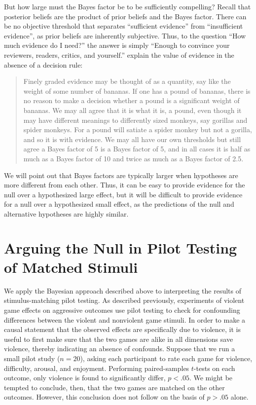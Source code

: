 \documentclass[man]{apa6}
\begin{document}
But how large must the Bayes factor be to be sufficiently compelling? Recall that posterior beliefs are the product of prior beliefs and the Bayes factor. There can be no objective threshold that separates ``sufficient evidence'' from ``insufficient evidence'', as prior beliefs are inherently subjective. Thus, to the question ``How much evidence do I need?'' the answer is simply ``Enough to convince your reviewers, readers, critics, and yourself.'' \citet[p. 12]{Rouder:etal:submitted} explain the value of evidence in the absence of a decision rule: 
\begin{quote}
Finely graded evidence may be thought of as a quantity, say like the weight of some number of bananas. If one has a pound of bananas, there is no reason to make a decision whether a pound is a significant weight of bananas. We may all agree that it is what it is, a pound, even though it may have different meanings to differently sized monkeys, say gorillas and spider monkeys. For a pound will satiate a spider monkey but not a gorilla, and so it is with evidence. We may all have our own thresholds but still agree a Bayes factor of 5 is a Bayes factor of 5, and in all cases it is half as much as a Bayes factor of 10 and twice as much as a Bayes factor of 2.5.
\end{quote}
We will point out that Bayes factors are typically larger when hypotheses are more different from each other. Thus, it can be easy to provide evidence for the null over a hypothesized large effect, but it will be difficult to provide evidence for a null over a hypothesized small effect, as the predictions of the null and alternative hypotheses are highly similar. 

  
\section{Arguing the Null in Pilot Testing of Matched Stimuli}
We apply the Bayesian approach described above to interpreting the results of stimulus-matching pilot testing.  As described previously, experiments of violent game effects on aggressive outcomes use pilot testing to check for confounding differences between the violent and nonviolent game stimuli. In order to make a causal statement that the observed effects are specifically due to violence, it is useful to first make sure that the two games are alike in all dimensions save violence, thereby indicating an absence of confounds. Suppose that we run a small pilot study ($n = 20$), asking each participant to rate each game for violence, difficulty, arousal, and enjoyment. Performing paired-samples $t$-tests on each outcome, only violence is found to significantly differ, $p < .05$. We might be tempted to conclude, then, that the two games are matched on the other outcomes. However, this conclusion does not follow on the basis of $p > .05$ alone.
\end{document}
